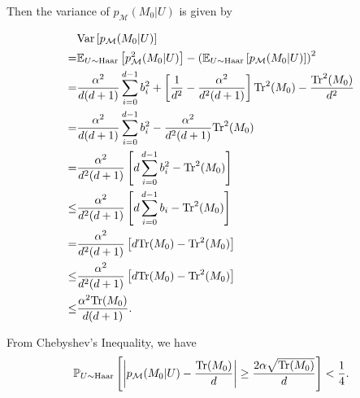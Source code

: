 Then the variance of $p_{\mathcal{M}}(M_0| U)$ is given by 

    \begin{equation}
        \begin{aligned}
            & \mathrm{Var}\left[p_{\mathcal{M}}(M_0| U)\right] \\
            = & \mathbb{E}_{U \sim \mathrm{Haar}}\left[ p^2_{\mathcal{M}}(M_0| U)\right] - \left(\mathbb{E}_{U \sim \mathrm{Haar}}\left[ p_{\mathcal{M}}(M_0| U)\right]\right)^2 \\
            = &\frac{\alpha^2}{d(d+1)} \sum_{i=0}^{d-1} b^2_i   + \left[\frac{1}{d^2} - \frac{\alpha^2}{d^2(d+1)}\right]\mathrm{Tr}^2(M_0) - \frac{\mathrm{Tr}^2(M_0)}{d^2} \\
            = &\frac{\alpha^2}{d(d+1)} \sum_{i=0}^{d-1} b^2_i   - \frac{\alpha^2}{d^2(d+1)}\mathrm{Tr}^2(M_0) \\
            = &\frac{\alpha^2}{d^2(d+1)} \left[d\sum_{i=0}^{d-1} b^2_i - \mathrm{Tr}^2(M_0)\right] \\
            \leq & \frac{\alpha^2}{d^2(d+1)} \left[d\sum_{i=0}^{d-1} b_i - \mathrm{Tr}^2(M_0)\right] \\
            = & \frac{\alpha^2}{d^2(d+1)} \left[d\mathrm{Tr}(M_0) - \mathrm{Tr}^2(M_0)\right] \\
            \leq & \frac{\alpha^2}{d^2(d+1)} \left[d\mathrm{Tr}(M_0) - \mathrm{Tr}^2(M_0)\right] \\ 
            \leq & \frac{\alpha^2\mathrm{Tr}(M_0)}{d(d+1)}.
        \end{aligned}
    \end{equation}

    From Chebyshev's Inequality, we have
    \begin{equation}
        \mathbb{P}_{U \sim \mathrm{Haar}} \left[ \left|p_{\mathcal{M}}(M_0| U) - \frac{\mathrm{Tr}(M_0)}{d}\right| \geq \frac{2\alpha\sqrt{\mathrm{Tr}(M_0)}}{d}\right]  < \frac{1}{4}.
    \end{equation}

